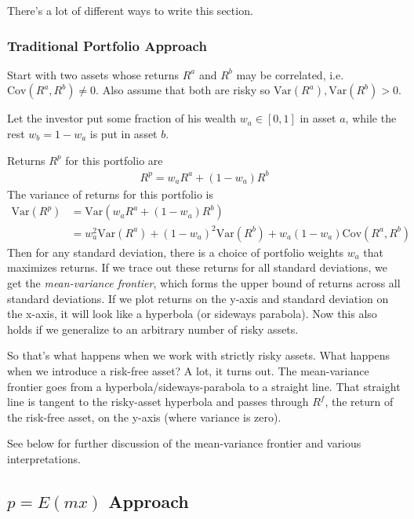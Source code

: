 \documentclass[a4paper,12pt]{scrartcl}
\begin{document}
There's a lot of different ways to write this section.

\subsubsection{Traditional Portfolio Approach}

Start with two assets whose returns $R^a$ and $R^b$ may be correlated,
i.e. $\text{Cov}(R^a,R^b) \neq 0$. Also assume that both are risky so
$\text{Var}(R^a), \text{Var}(R^b)>0$.

Let the investor put some fraction of his wealth $w_a \in [0,1]$ in
asset $a$, while the rest $w_b = 1-w_a$ is put in asset $b$.

Returns $R^p$ for this portfolio are
\begin{align*}
  R^p = w_a R^a + (1-w_a) R^b
\end{align*}
The variance of returns for this portfolio is
\begin{align*}
  \text{Var}(R^p) &= \text{Var}(w_a R^a + (1-w_a)R^b) \\
  &= w_a^2 \text{Var}(R^a) + (1-w_a)^2\text{Var}(R^b)
    + w_a(1-w_a)\text{Cov}(R^a,R^b)
\end{align*}
Then for any standard deviation, there is a choice of portfolio weights
$w_a$ that maximizes returns. If we trace out these returns for all
standard deviations, we get the \emph{mean-variance frontier}, which
forms the upper bound of returns across all standard deviations. If we
plot returns on the y-axis and standard deviation on the x-axis, it will
look like a hyperbola (or sideways parabola).  Now this also holds if we
generalize to an arbitrary number of risky assets.

So that's what happens when we work with strictly risky assets. What
happens when we introduce a risk-free asset? A lot, it turns out. The
mean-variance frontier goes from a hyperbola/sideways-parabola to a
straight line.  That straight line is tangent to the risky-asset
hyperbola and passes through $R^f$, the return of the risk-free asset,
on the y-axis (where variance is zero).

See below for further discussion of the mean-variance frontier and
various interpretations.

\subsection{$p=E(mx)$ Approach}
\end{document}
